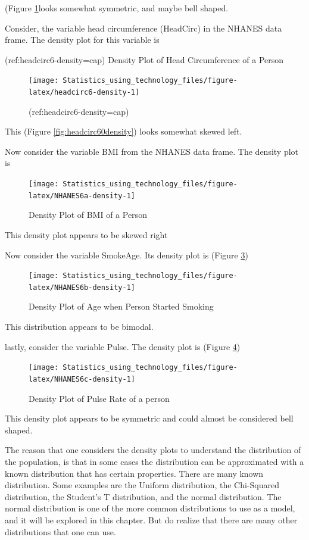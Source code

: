 \documentclass[
]{book}
\begin{document}
(Figure \ref{fig:headcirc6-density}looks somewhat symmetric, and maybe bell shaped.

Consider, the variable head circumference (HeadCirc) in the NHANES data frame. The density plot for this variable is

(ref:headcirc6-density=cap) Density Plot of Head Circumference of a Person

\begin{figure}
\texttt{[image: Statistics\_using\_technology\_files/figure-latex/headcirc6-density-1]} \caption{(ref:headcirc6-density=cap)}\label{fig:headcirc6-density}
\end{figure}

This (Figure \ref{fig:headcirc60density}) looks somewhat skewed left.

Now consider the variable BMI from the NHANES data frame. The density plot is



\begin{figure}
\texttt{[image: Statistics\_using\_technology\_files/figure-latex/NHANES6a-density-1]} \caption{Density Plot of BMI of a Person}\label{fig:NHANES6a-density}
\end{figure}

This density plot appears to be skewed right

Now consider the variable SmokeAge. Its density plot is (Figure \ref{fig:NHANES6b-density})



\begin{figure}
\texttt{[image: Statistics\_using\_technology\_files/figure-latex/NHANES6b-density-1]} \caption{Density Plot of Age when Person Started Smoking}\label{fig:NHANES6b-density}
\end{figure}

This distribution appears to be bimodal.

lastly, consider the variable Pulse. The density plot is (Figure \ref{fig:NHANES6c-density})



\begin{figure}
\texttt{[image: Statistics\_using\_technology\_files/figure-latex/NHANES6c-density-1]} \caption{Density Plot of Pulse Rate of a person}\label{fig:NHANES6c-density}
\end{figure}

This density plot appears to be symmetric and could almost be considered bell shaped.

The reason that one considers the density plots to understand the distribution of the population, is that in some cases the distribution can be approximated with a known distribution that has certain properties. There are many known distribution. Some examples are the Uniform distribution, the Chi-Squared distribution, the Student's T distribution, and the normal distribution. The normal distribution is one of the more common distributions to use as a model, and it will be explored in this chapter. But do realize that there are many other distributions that one can use.
\end{document}
